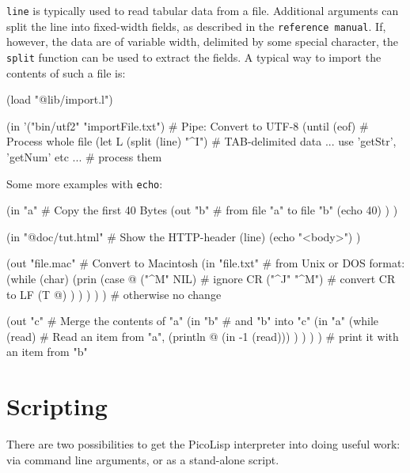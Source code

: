 \texttt{line} is typically used to read tabular data from a file. Additional
arguments can split the line into fixed-width fields, as described in
the \texttt{reference manual}. If, however, the data are of variable width,
delimited by some special character, the \texttt{split} function can be used to
extract the fields. A typical way to import the contents of such a file
is:


\begin{wideverbatim}
(load "@lib/import.l")

(in '("bin/utf2" "importFile.txt")              # Pipe: Convert to UTF-8
   (until (eof)                                 # Process whole file
      (let L (split (line) "^I")                # TAB-delimited data
         ... use 'getStr', 'getNum' etc ...     # process them
\end{wideverbatim}

Some more examples with \texttt{echo}:


\begin{wideverbatim}
(in "a"                                         # Copy the first 40 Bytes
   (out "b"                                     # from file "a" to file "b"
      (echo 40) ) )

(in "@doc/tut.html"                             # Show the HTTP-header
   (line)
   (echo "<body>") )

(out "file.mac"                                 # Convert to Macintosh
   (in "file.txt"                               # from Unix or DOS format:
      (while (char)
         (prin
            (case @
               ("^M" NIL)                       # ignore CR
               ("^J" "^M")                      # convert CR to LF
               (T @) ) ) ) ) )                  # otherwise no change

(out "c"                                        # Merge the contents of "a"
   (in "b"                                      # and "b" into "c"
      (in "a"
         (while (read)                          # Read an item from "a",
            (println @ (in -1 (read))) ) ) ) )  # print it with an item from "b"
\end{wideverbatim}

 
\section{Scripting}
\label{sec:tut-scripting}


There are two possibilities to get the PicoLisp interpreter into doing
useful work: via command line arguments, or as a stand-alone script.

